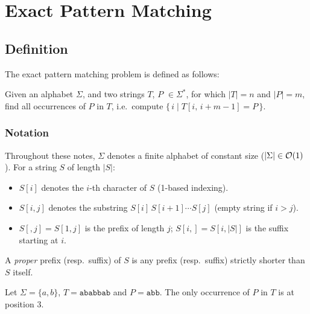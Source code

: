 \section{Exact Pattern Matching}

\subsection{Definition}

The exact pattern matching problem is defined as follows:
\begin{problem}
  Given an alphabet $\Sigma$, and two strings $T$, $P$ $\in \Sigma^*$, for which $|T| = n$ and $|P| = m$, find all
  occurrences of $P$ in $T$, i.e.\ compute $\{\, i \mid T[i,\, i+m-1] = P \,\}$.
\end{problem}

\subsubsection*{Notation}

Throughout these notes, $\Sigma$ denotes a finite alphabet of constant size ($|\Sigma| \in \mathcal{O}\!\left(1\right)$). For a string $S$ of length $|S|$:
\begin{itemize}[nosep]
  \item $S[i]$ denotes the $i$-th character of $S$ (1-based indexing).
  \item $S[i,j]$ denotes the substring $S[i]\,S[i+1]\cdots S[j]$ (empty string if $i > j$).
  \item $S[{,}j] = S[1,j]$ is the prefix of length $j$; $S[i{,}] = S[i,|S|]$ is the suffix starting at $i$.
\end{itemize}
A \emph{proper} prefix (resp.\ suffix) of $S$ is any prefix (resp.\ suffix) strictly shorter than $S$ itself.

\begin{example}
  Let $\Sigma = \{a, b\}$, $T = \texttt{ababbab}$ and $P = \texttt{abb}$. The only occurrence of $P$ in $T$ is at
  position $3$.
\end{example}

